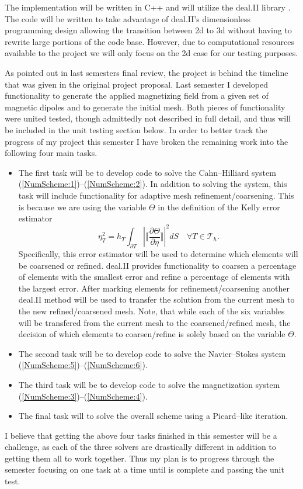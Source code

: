 \documentclass[11pt,fullpage]{article}
\newcommand{\Tau}{\mathcal{T}}
\newcommand{\abs}[1]{\left\vert#1\right\vert}
\theoremstyle{lemma}
\theoremstyle{definition}
\theoremstyle{lemma}
\begin{document}
The implementation will be written in C++ and will utilize the deal.II library \cite{AdaptiveMesh, DealII}. The code will be written to take advantage of deal.II's dimensionless programming design allowing the transition between 2d to 3d without having to rewrite large portions of the code base. However, due to computational resources available to the project we will only focus on the 2d case for our testing purposes. 

As pointed out in last semesters final review, the project is behind the timeline that was given in the original project proposal. Last semester I developed functionality to generate the applied magnetizing field from a given set of magnetic dipoles and to generate the initial mesh. Both pieces of functionality were united tested, though admittedly not described in full detail, and thus will be included in the unit testing section below. In order to better track the progress of my project this semester I have broken the remaining work into the following four main tasks.
\begin{itemize}
	\item The first task will be to develop code to solve the Cahn--Hilliard system (\ref{NumScheme:1})--(\ref{NumScheme:2}). In addition to solving the system, this task will include functionality for adaptive mesh refinement/coarsening. This is because we are using the variable $\Theta$ in the definition of the Kelly error estimator \cite{ErrorInd}
	\begin{equation}\label{ErrorInd}
	\eta_T^2 = h_T\int_{\partial T}\abs{\bigg\llbracket\frac{\partial \Theta}{\partial \eta}\bigg\rrbracket}^2dS \quad \forall T\in\Tau_h.
	\end{equation}
	Specifically, this error estimator will be used to determine which elements will be coarsened or refined. deal.II provides functionality to coarsen a percentage of elements with the smallest error and refine a percentage of elements with the largest error. After marking elements for refinement/coarsening another deal.II method will be used to transfer the solution from the current mesh to the new refined/coarsened mesh. Note, that while each of the six variables will be transfered from the current mesh to the coarsened/refined mesh, the decision of which elements to coarsen/refine is solely based on the variable $\Theta$.
	
	\item The second task will be to develop code to solve the Navier--Stokes system (\ref{NumScheme:5})--(\ref{NumScheme:6}).
	
	\item The third task will be to develop code to solve the magnetization system (\ref{NumScheme:3})--(\ref{NumScheme:4}). 
	
	\item The final task will to solve the overall scheme using a Picard--like iteration.
\end{itemize}
I believe that getting the above four tasks finished in this semester will be a challenge, as each of the three solvers are drastically different in addition to getting them all to work together. Thus my plan is to progress through the semester focusing on one task at a time until is complete and passing the unit test.
\end{document}
